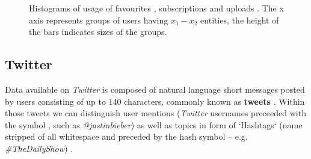 \begin{figure}[ht]
  \centering
  \label{fig:subfigureExample}
  \caption{Histograms of usage of favourites , subscriptions
   and uploads . The x axis represents groups of
  users having $x_1-x_2$ entities, the height of the bars indicates sizes of the
  groups.}
\end{figure}

\newpage
\subsection{Twitter}

Data available on \textit{Twitter} is composed of natural language short messages posted by users
consisting of up to 140 characters, commonly known as \textbf{tweets} \cite{why-we-twitter}. Within
those tweets we can distinguish user mentions (\textit{Twitter} usernames preceeded with the symbol \@,
such as \textit{@justinbieber}) as well as topics in form of `Hashtags` (name stripped of all whitespace
and preceded by the hash symbol -- e.g. \textit{\#TheDailyShow}) \cite{edinburg-corpus}.

